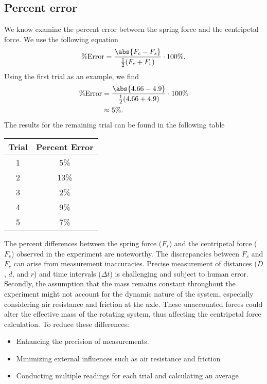 \documentclass{report}
\begin{document}
    \subsection{Percent error}
    \bigbreak \noindent 
    We know examine the percent error between the spring force and the centripetal force. We use the following equation
    \begin{align*}
        \text{\%Error} = \frac{\abs{F_{c} - F_{s}}}{\frac{1}{2}(F_{c} + F_{s})} \cdot 100\%
    .\end{align*}
    \bigbreak \noindent 
    Using the first trial as an example, we find
    \begin{align*}
        \text{\%Error} &= \frac{\abs{4.66 - 4.9}}{\frac{1}{2}(4.66+4.9)} \cdot 100\% \\
        &\approx 5\%
    .\end{align*}
    \bigbreak \noindent 
    The results for the remaining trial can be found in the following table
    \bigbreak \noindent 
    \begin{center}
        \begin{tabular}{c|c}
            Trial & Percent Error \\
            \hline
            1 & 5\%\\
            2 & 13\%\\
            3 & 2\%\\
            4 & 9\%\\
            5 & 7\%\\
        \end{tabular}
    \end{center}
    \bigbreak \noindent 
    \begin{remark}
        The percent differences between the spring force ($F_s$) and the centripetal force ($F_c$) observed in the experiment are noteworthy. 
        \bigbreak \noindent 
         The discrepancies between $F_s$ and $F_c$ can arise from measurement inaccuracies. Precise measurement of distances ($D$, $d$, and $r$) and time intervals ($\Delta t$) is challenging and subject to human error.  
        \bigbreak \noindent 
        Secondly, the assumption that the mass remains constant throughout the experiment might not account for the dynamic nature of the system, especially considering air resistance and friction at the axle. These unaccounted forces could alter the effective mass of the rotating system, thus affecting the centripetal force calculation.
        \bigbreak \noindent 
        To reduce these differences:
        \begin{itemize}
            \item Enhancing the precision of measurements. 
            \item Minimizing external influences such as air resistance and friction 
            \item Conducting multiple readings for each trial and calculating an average 
        \end{itemize}
    \end{remark}
\end{document}
